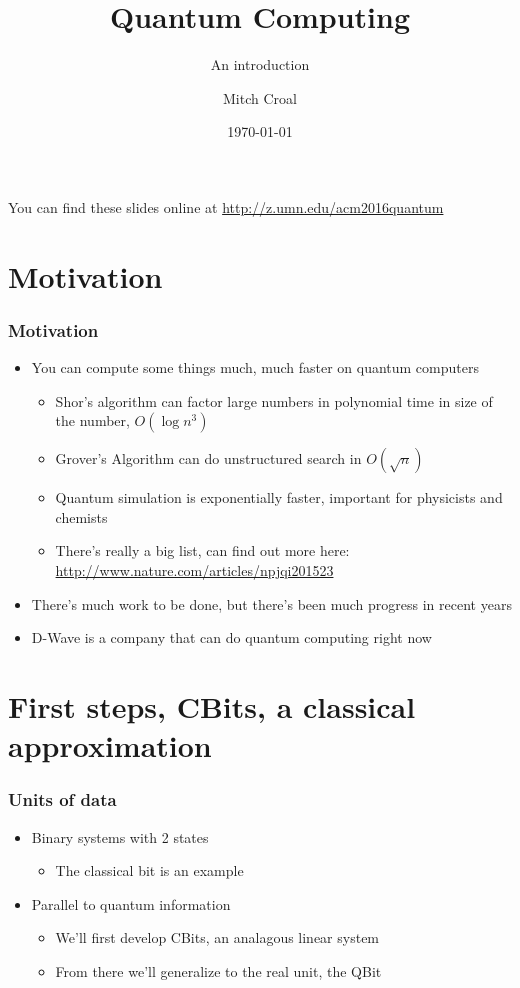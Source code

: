 \documentclass{beamer}
\title{Quantum Computing}
\subtitle{An introduction}
\author{Mitch Croal}
\date{\today}
\begin{document}
  \begin{frame}
    \titlepage{}
    You can find these slides online at \url{http://z.umn.edu/acm2016quantum}
  \end{frame}


  \section{Motivation}
  \begin{frame}
    \frametitle{Motivation}
    \begin{itemize}
      \item{You can compute some things much, much faster on quantum computers}
      \begin{itemize}
        \item{Shor's algorithm can factor large numbers in polynomial time in size of the number,
          $O(\log{n}^{3})$}
        \item{Grover's Algorithm can do unstructured search in $O(\sqrt{n})$}
        \item{Quantum simulation is exponentially faster, important for physicists and chemists}
        \item{There's really a big list, can find out more here: \url{http://www.nature.com/articles/npjqi201523}}
      \end{itemize}
      \item{There's much work to be done, but there's been much progress in recent years}
      \item{D-Wave is a company that can do quantum computing right now}
    \end{itemize}
  \end{frame}

  \section{First steps, CBits, a classical approximation}
  \begin{frame}
    \frametitle{Units of data}
    \begin{itemize}
      \item{Binary systems with 2 states}
      \begin{itemize}
        \item{The classical bit is an example}
      \end{itemize}

      \item{Parallel to quantum information}
      \begin{itemize}
        \item{We'll first develop CBits, an analagous linear system}
        \item{From there we'll generalize to the real unit, the QBit}
      \end{itemize}
    \end{itemize}
  \end{frame}
\end{document}
